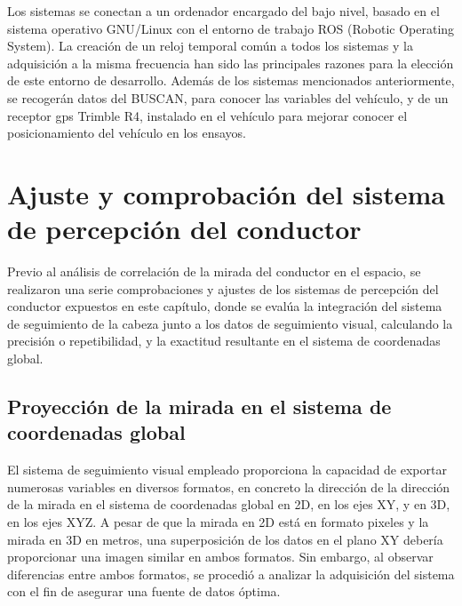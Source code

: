 Los sistemas se conectan a un ordenador encargado del bajo nivel, basado en el sistema operativo GNU/Linux con el entorno de trabajo ROS (Robotic Operating System). La creación de un reloj temporal común a todos los sistemas y la adquisición a la misma frecuencia han sido las principales razones para la elección de este entorno de desarrollo.
Además de los sistemas mencionados anteriormente, se recogerán datos del BUSCAN, para conocer las variables del vehículo, y de un receptor \gls{gps} Trimble R4, instalado en el vehículo para mejorar conocer el posicionamiento del vehículo en los ensayos.

\section{Ajuste y comprobación del sistema de percepción del conductor }\label{43}

Previo al análisis de correlación de la mirada del conductor en el espacio, se realizaron una serie comprobaciones y ajustes de los sistemas de percepción del conductor expuestos en este capítulo, donde se evalúa la integración del sistema de seguimiento de la cabeza junto a los datos de seguimiento visual, calculando la precisión o repetibilidad, y la exactitud resultante en el sistema de coordenadas global.

\subsection{Proyección de la mirada en el sistema de coordenadas global}\label{431}

El sistema de seguimiento visual empleado proporciona la capacidad de exportar numerosas variables en diversos formatos, en concreto la dirección de la dirección de la mirada en el sistema de coordenadas global en 2D, en los ejes XY, y en 3D, en los ejes XYZ. A pesar de que la mirada en 2D está en formato pixeles y la mirada en 3D en metros, una superposición de los datos en el plano XY debería proporcionar una imagen similar en ambos formatos. Sin embargo, al observar diferencias entre ambos formatos, se procedió a analizar la adquisición del sistema con el fin de asegurar una fuente de datos óptima.

